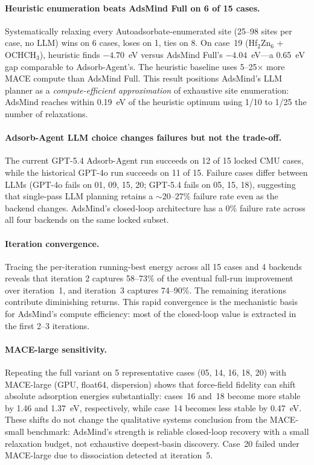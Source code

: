 \paragraph{Heuristic enumeration beats AdsMind Full on 6 of 15 cases.}
Systematically relaxing every Autoadsorbate-enumerated site (25--98 sites per case, no LLM) wins on 6 cases, loses on 1, ties on 8.
On case~19 (Hf$_2$Zn$_6$ + OCHCH$_3$), heuristic finds $-4.70$~eV versus AdsMind Full's $-4.04$~eV---a 0.65~eV gap comparable to Adsorb-Agent's.
The heuristic baseline uses 5--25$\times$ more MACE compute than AdsMind Full.
This result positions AdsMind's LLM planner as a \textit{compute-efficient approximation} of exhaustive site enumeration: AdsMind reaches within 0.19~eV of the heuristic optimum using 1/10 to 1/25 the number of relaxations.

\paragraph{Adsorb-Agent LLM choice changes failures but not the trade-off.}
The current GPT-5.4 Adsorb-Agent run succeeds on 12 of 15 locked CMU cases, while the historical GPT-4o run succeeds on 11 of 15.
Failure cases differ between LLMs (GPT-4o fails on 01, 09, 15, 20; GPT-5.4 fails on 05, 15, 18), suggesting that single-pass LLM planning retains a $\sim$20--27\% failure rate even as the backend changes.
AdsMind's closed-loop architecture has a 0\% failure rate across all four backends on the same locked subset.

\paragraph{Iteration convergence.}
Tracing the per-iteration running-best energy across all 15 cases and 4 backends reveals that iteration 2 captures 58--73\% of the eventual full-run improvement over iteration~1, and iteration~3 captures 74--90\%.
The remaining iterations contribute diminishing returns.
This rapid convergence is the mechanistic basis for AdsMind's compute efficiency: most of the closed-loop value is extracted in the first 2--3 iterations.

\paragraph{MACE-large sensitivity.}
Repeating the full variant on 5 representative cases (05, 14, 16, 18, 20) with MACE-large (GPU, float64, dispersion) shows that force-field fidelity can shift absolute adsorption energies substantially: cases~16 and~18 become more stable by 1.46 and 1.37~eV, respectively, while case~14 becomes less stable by 0.47~eV.
These shifts do not change the qualitative systems conclusion from the MACE-small benchmark: AdsMind's strength is reliable closed-loop recovery with a small relaxation budget, not exhaustive deepest-basin discovery.
Case~20 failed under MACE-large due to dissociation detected at iteration~5.

